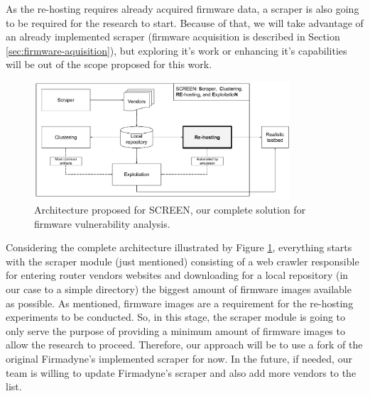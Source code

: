 As the re-hosting requires already acquired firmware data, a scraper is also going to be required for the research to start. Because of that, we will take advantage of an already implemented scraper (firmware acquisition is described in Section \ref{sec:firmware-aquisition}), but exploring it's work or enhancing it's capabilities will be out of the scope proposed for this work.

\begin{figure}[h]
    \centering
    \includegraphics[width=0.85\textwidth]{figs/screen.pdf}
    \caption{Architecture proposed for SCREEN, our complete solution for firmware vulnerability analysis.}
    \label{fig:architecture}
\end{figure}


Considering the complete architecture illustrated by Figure \ref{fig:architecture}, everything starts with the scraper module (just mentioned) consisting of a web crawler responsible for entering router vendors websites and downloading for a local repository (in our case to a simple directory) the biggest amount of firmware images available as possible. As mentioned, firmware images are a requirement for the re-hosting experiments to be conducted. So, in this stage, the scraper module is going to only serve the purpose of providing a minimum amount of firmware images to allow the research to proceed. Therefore, our approach will be to use a fork of the original Firmadyne's \cite{firmadyne} implemented scraper for now. In the future, if needed, our team is willing to update Firmadyne's scraper and also add more vendors to the list.


